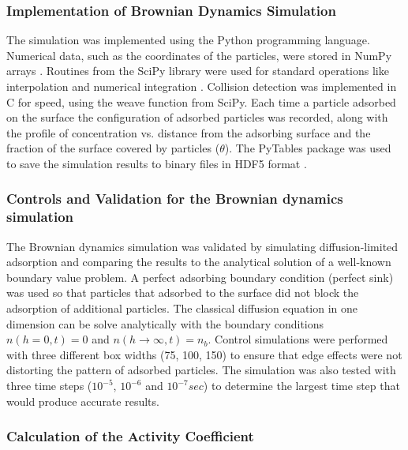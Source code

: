 \subsubsection{Implementation of Brownian Dynamics Simulation}

The simulation was implemented using the Python programming language.
Numerical data, such as the coordinates of the particles, were stored
in NumPy arrays \cite{Oliphant2006}. Routines from the SciPy library
were used for standard operations like interpolation and numerical
integration \cite{Oliphant2007}. Collision detection was implemented
in C for speed, using the weave function from SciPy. Each time a particle
adsorbed on the surface the configuration of adsorbed particles was
recorded, along with the profile of concentration vs. distance from
the adsorbing surface and the fraction of the surface covered by particles
($\theta$). The PyTables package was used to save the simulation
results to binary files in HDF5 format \cite{Alted2002-,HDFGroup2000-}. 


\subsubsection{Controls and Validation for the Brownian dynamics simulation}

The Brownian dynamics simulation was validated by simulating diffusion-limited
adsorption and comparing the results to the analytical solution of
a well-known boundary value problem. A perfect adsorbing boundary
condition (perfect sink) was used so that particles that adsorbed
to the surface did not block the adsorption of additional particles.
The classical diffusion equation in one dimension can be solve analytically
with the boundary conditions $n(h=0,t)=0$ and $n(h\rightarrow\infty,t)=n_{b}$.
Control simulations were performed with three different box widths
(75, 100, 150) to ensure that edge effects were not distorting the
pattern of adsorbed particles. The simulation was also tested with
three time steps ($10^{-5}$, $10^{-6}$ and $10^{-7}sec$) to determine
the largest time step that would produce accurate results.


\subsubsection{Calculation of the Activity Coefficient}

